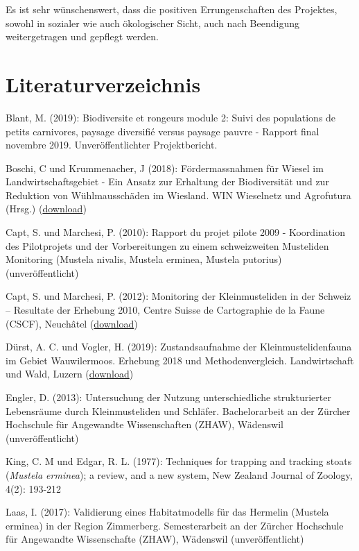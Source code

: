 \documentclass[
]{scrbook}
\begin{document}
Es ist sehr wünschenswert, dass die positiven Errungenschaften des Projektes, sowohl in sozialer wie auch ökologischer Sicht, auch nach Beendigung weitergetragen und gepflegt werden.

\hypertarget{literaturverzeichnis}{%
\chapter{Literaturverzeichnis}\label{literaturverzeichnis}}

Blant, M. (2019): Biodiversite et rongeurs module 2: Suivi des populations de petits carnivores, paysage diversifié versus paysage pauvre - Rapport final novembre 2019. Unveröffentlichter Projektbericht.

Boschi, C und Krummenacher, J (2018): Fördermassnahmen für Wiesel im Landwirtschaftsgebiet - Ein Ansatz zur Erhaltung der Biodiversität und zur Reduktion von Wühlmausschäden im Wiesland. WIN Wieselnetz und Agrofutura (Hrsg.) (\href{http://wieselnetz.ch/wp-content/uploads/2018/02/Heft_Wieselfoerdermassnahmen_D_Ed2_CMYK.pdf}{download})

Capt, S. und Marchesi, P. (2010): Rapport du projet pilote 2009 - Koordination des Pilotprojets und der Vorbereitungen zu einem schweizweiten Musteliden Monitoring (Mustela nivalis, Mustela erminea, Mustela putorius) (unveröffentlicht)

Capt, S. und Marchesi, P. (2012): Monitoring der Kleinmusteliden in der Schweiz -- Resultate der Erhebung 2010, Centre Suisse de Cartographie de la Faune (CSCF), Neuchâtel (\href{http://wieselnetz.ch/wp-content/uploads/2016/03/CSCF_Bericht_Monitoring_2010.pdf}{download})

Dürst, A. C. und Vogler, H. (2019): Zustandsaufnahme der Kleinmustelidenfauna im Gebiet Wauwilermoos. Erhebung 2018 und Methodenvergleich. Landwirtschaft und Wald, Luzern (\href{https://lawa.lu.ch/-/media/LAWA/Dokumente/njf/jagd/wildhut/BE_Kleinmusteliden.pdf?la=de-CH\&hash=36F5693ABEA00418BC192264A90DDDC4D95D10A0}{download})

Engler, D. (2013): Untersuchung der Nutzung unterschiedliche strukturierter Lebensräume durch Kleinmusteliden und Schläfer. Bachelorarbeit an der Zürcher Hochschule für Angewandte Wissenschaften (ZHAW), Wädenswil (unveröffentlicht)

King, C. M und Edgar, R. L. (1977): Techniques for trapping and tracking stoats (\emph{Mustela erminea}); a review, and a new system, New Zealand Journal of Zoology, 4(2): 193-212

Laas, I. (2017): Validierung eines Habitatmodells für das Hermelin (Mustela erminea) in der Region Zimmerberg. Semesterarbeit an der Zürcher Hochschule für Angewandte Wissenschafte (ZHAW), Wädenswil (unveröffentlicht)
\end{document}
